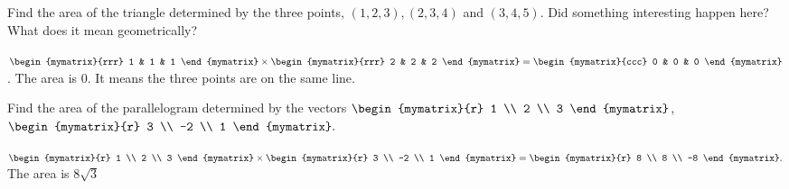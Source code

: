 \begin{enumialphparenastyle}
\begin{ex} Find the area of the triangle determined by the three points, $\left(
1,2,3\right) ,\left( 2,3,4\right) $ and $\left( 3,4,5\right) .$ Did
something interesting happen here? What does it mean geometrically?
\begin{sol}
$\begin{mymatrix}{rrr}
1 & 1 & 1
\end{mymatrix} \times \begin{mymatrix}{rrr}
 2 & 2 & 2
\end{mymatrix} =\begin{mymatrix}{ccc}
0 & 0 & 0
\end{mymatrix} $.  The area is 0. It means the three points are on the same line.
\end{sol}
\end{ex}

\begin{ex} Find the area of the parallelogram determined by the vectors $\begin{mymatrix}{r}
1 \\
2 \\
3
\end{mymatrix} $, $\begin{mymatrix}{r}
3 \\
-2 \\
1
\end{mymatrix} .$
\begin{sol}
$\begin{mymatrix}{r}
1 \\
2 \\
3
\end{mymatrix} \times
\begin{mymatrix}{r}
3 \\
-2 \\
1
\end{mymatrix} =\begin{mymatrix}{r}
8 \\
8 \\
-8
\end{mymatrix} .$ The area is $8\sqrt{3}$
\end{sol}
\end{ex}



\end{enumialphparenastyle}
